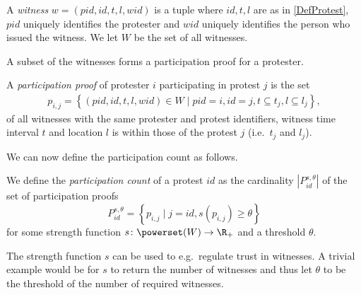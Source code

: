 \begin{frame}
\begin{definition}[Witness]
  A \emph{witness} \(w = (pid, id, t, l, wid)\) is a tuple where
  \(id, t, l\) are as in \cref{DefProtest},
  \(pid\) uniquely identifies the protester and \(wid\) uniquely identifies the 
  person who issued the witness.
  We let \(W\) be the set of all witnesses.
\end{definition}
\end{frame}

A subset of the witnesses forms a participation proof for a protester.

\begin{frame}
\begin{definition}
  A \emph{participation proof} of protester \(i\) participating in protest \(j\) 
  is the set
  \begin{align}
    \nonumber
    p_{i, j} =
    \left\{ (pid, id, t, l, wid)\in W \mid
    pid = i, id = j,
    t \subseteq t_j, l\subseteq l_j \right\},
  \end{align}
  of all witnesses with the same protester and protest identifiers, witness time 
  interval \(t\) and location \(l\) is within those of the protest \(j\) (i.e.\ 
  \(t_j\) and \(l_j\)).
\end{definition}
\end{frame}

We can now define the participation count as follows.
\begin{frame}
\begin{definition}
  We define the \emph{participation count} of a protest \(id\) as the 
  cardinality \(|P_{id}^{s,\theta}|\) of the set of participation proofs \[
    P_{id}^{s,\theta} = \left\{ p_{i,j} \mid
      j = id, s(p_{i,j})\geq \theta \right\}
  \] for some strength function \(s\colon \powerset(W)\to \R_+\) and a threshold 
  \(\theta\).
\end{definition}

\pause{}

\end{frame}

The strength function \(s\) can be used to e.g.\ regulate trust in witnesses.
A trivial example would be for \(s\) to return the number of witnesses and thus 
let \(\theta\) to be the threshold of the number of required witnesses.
